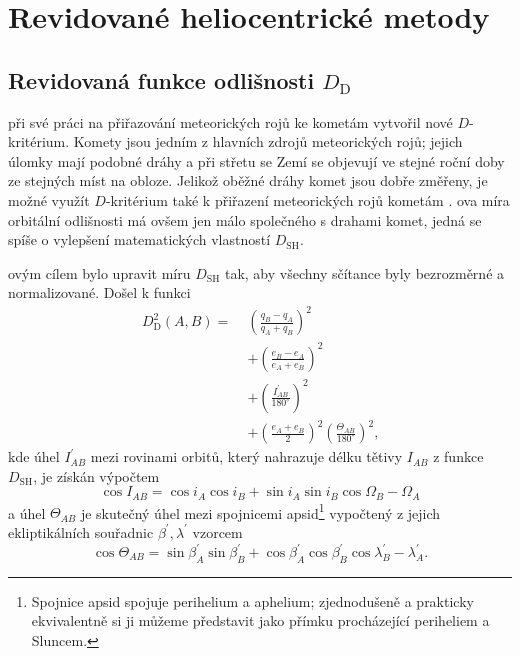 \chapter{Revidované heliocentrické metody}%

\section{Revidovaná funkce odlišnosti $D_\text{D}$}%
\citeauthor{cometassoc} při své práci na přiřazování meteorických rojů ke kometám \cite{cometassoc} vytvořil nové $D$-kritérium. Komety jsou jedním z hlavních zdrojů meteorických rojů; jejich úlomky mají podobné dráhy a při střetu se Zemí se objevují ve stejné roční doby ze stejných míst na obloze. Jelikož oběžné dráhy komet jsou dobře změřeny, je možné využít $D$-kritérium také k přiřazení meteorických rojů kometám \cite{cometassoc}. \citeauthor{cometassoc}ova míra orbitální odlišnosti má ovšem jen málo společného s drahami komet, jedná se spíše o vylepšení matematických vlastností $D_\text{SH}$.

\citeauthor{cometassoc}ovým cílem bylo upravit míru $D_\text{SH}$ tak, aby všechny sčítance byly bezrozměrné a normalizované. Došel k funkci \cite{cometassoc}\cite{remarks}
\begin{equation}
    \begin{aligned}
        D_\text{D}^2(A,B)=\; & \left( \frac{q_B-q_A}{q_A+q_B} \right)^2                                                   \\
                             & +\left( \frac{e_B-e_A}{e_A+e_B} \right)^2                                                  \\
                             & +\left( \frac{I^\prime_{AB}}{180^\circ} \right)^2                                          \\
                             & +\left( \frac{e_A+e_B}{2} \right)^2\left( \frac{\Theta_{AB}}{180^\circ} \right)^2 \text{,}
    \end{aligned}
    \label{eqn:revised:d_d}
\end{equation}
kde úhel $I^\prime_{AB}$ mezi rovinami orbitů, který nahrazuje délku tětivy $I_{AB}$ z funkce $D_\text{SH}$, je získán výpočtem \cite{cometassoc}
\begin{equation}
    \cos{I_{AB}}=\cos{i_A}\cos{i_B}+\sin{i_A}\sin{i_B}\cos{\Omega_B-\Omega_A}
\end{equation}
a úhel $\Theta_{AB}$ je skutečný úhel mezi spojnicemi apsid\footnote{Spojnice apsid spojuje perihelium a aphelium; zjednodušeně a prakticky ekvivalentně si ji můžeme představit jako přímku procházející periheliem a Sluncem.} vypočtený z jejich ekliptikálních souřadnic $\beta^\prime,\lambda^\prime$ vzorcem \cite{cometassoc}
\begin{equation}
    \cos{\Theta_{AB}}=\sin{\beta^\prime_A}\sin{\beta^\prime_B}+\cos{\beta^\prime_A}\cos{\beta^\prime_B}\cos{\lambda^\prime_B-\lambda^\prime_A} \text{.}
\end{equation}

